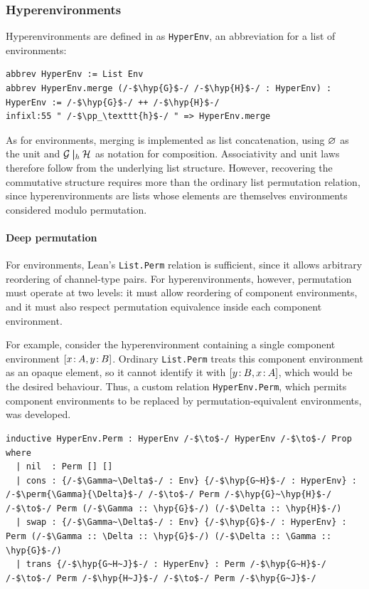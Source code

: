 \subsubsection{Hyperenvironments}\label{subsubsec:hyperenvironments} Hyperenvironments are defined in  as \texttt{HyperEnv}, an abbreviation for a list of environments:

\begin{lstlisting}[language=Lean4]
abbrev HyperEnv := List Env
abbrev HyperEnv.merge (/-$\hyp{G}$-/ /-$\hyp{H}$-/ : HyperEnv) : HyperEnv := /-$\hyp{G}$-/ ++ /-$\hyp{H}$-/
infixl:55 " /-$\pp_\texttt{h}$-/ " => HyperEnv.merge
\end{lstlisting}

As for environments, merging is implemented as list concatenation, using {$\varnothing$} as the unit and {$\mathcal{G}\mathbin{\boldsymbol{|}}_h\mathcal{H}$} as notation for composition. Associativity and unit laws therefore follow from the underlying list structure. However, recovering the commutative structure requires more than the ordinary list permutation relation, since hyperenvironments are lists whose elements are themselves environments considered modulo permutation.

\paragraph{Deep permutation} 
For environments, Lean's \texttt{List.Perm} relation is sufficient, since it allows arbitrary reordering of channel-type pairs. For hyperenvironments, however, permutation must operate at two levels: it must allow reordering of component environments, and it must also respect permutation equivalence inside each component environment.

For example, consider the hyperenvironment containing a single component environment {$[x\colon\mspace{-2mu}A, y\colon\mspace{-2mu}B]$}. Ordinary \texttt{List.Perm} treats this component environment as an opaque element, so it cannot identify it with {$[y\colon\mspace{-2mu}B, x\colon\mspace{-2mu}A]$}, which would be the desired behaviour. Thus, a custom relation \texttt{HyperEnv.Perm}, which permits component environments to be replaced by permutation-equivalent environments, was developed.

\begin{lstlisting}[language=Lean4]
inductive HyperEnv.Perm : HyperEnv /-$\to$-/ HyperEnv /-$\to$-/ Prop where
  | nil  : Perm [] []
  | cons : {/-$\Gamma~\Delta$-/ : Env} {/-$\hyp{G~H}$-/ : HyperEnv} : /-$\perm{\Gamma}{\Delta}$-/ /-$\to$-/ Perm /-$\hyp{G}~\hyp{H}$-/ /-$\to$-/ Perm (/-$\Gamma :: \hyp{G}$-/) (/-$\Delta :: \hyp{H}$-/)
  | swap : {/-$\Gamma~\Delta$-/ : Env} {/-$\hyp{G}$-/ : HyperEnv} : Perm (/-$\Gamma :: \Delta :: \hyp{G}$-/) (/-$\Delta :: \Gamma :: \hyp{G}$-/)
  | trans {/-$\hyp{G~H~J}$-/ : HyperEnv} : Perm /-$\hyp{G~H}$-/ /-$\to$-/ Perm /-$\hyp{H~J}$-/ /-$\to$-/ Perm /-$\hyp{G~J}$-/
\end{lstlisting}

